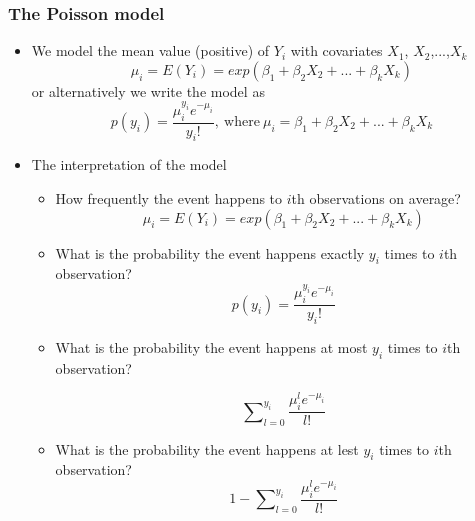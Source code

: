 \documentclass{beamer}
\begin{document}
\begin{frame}[allowframebreaks]
  \frametitle{The Poisson model}

  \begin{itemize}
  \item We model the mean value (positive) of $Y_i$ with covariates $X_1$,
    $X_2$,...,$X_k$
    \begin{equation*}
      \mu_i = E(Y_i)= exp (\beta_1 + \beta_2X_2
      +...+\beta_kX_k)
    \end{equation*}
    or alternatively we write the model as
    \begin{equation*}
      p(y_i) = \frac{\mu_i^{y_i}e^{-\mu_i}}{y_i!},
      ~\text{where}~ \mu_i = \beta_1 + \beta_2X_2 +...+\beta_kX_k
    \end{equation*}
  \item The interpretation of the model
    \begin{itemize}
    \item How frequently the event happens to $i$th observations on average?
      \begin{equation*}
        \mu_i = E(Y_i)= exp (\beta_1 + \beta_2X_2
        +...+\beta_kX_k)
      \end{equation*}

    \item What is the probability the event happens exactly $y_i$ times to $i$th
      observation?
      \begin{equation*}
        p(y_i) = \frac{\mu_i^{y_i}e^{-\mu_i}}{y_i!}
      \end{equation*}

    \item What is the probability the event happens at most $y_i$ times to $i$th
      observation?

      \begin{equation*}
        \sum \nolimits_{l=0}^{y_i} \frac{\mu_i^{l}e^{-\mu_i}}{l!}
      \end{equation*}

    \item What is the probability the event happens at lest $y_i$ times to $i$th
      observation?
      \begin{equation*}
        1- \sum \nolimits_{l=0}^{y_i} \frac{\mu_i^{l}e^{-\mu_i}}{l!}
      \end{equation*}



\end{itemize}
\end{itemize}
\end{frame}
\end{document}

